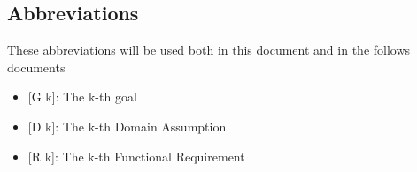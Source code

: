 \subsection{Abbreviations}
These abbreviations will be used both in this document and in the follows documents
\begin{itemize}
	\item {[}G k{]}: The k-th goal
    \item {[}D k{]}: The k-th Domain Assumption
    \item {[}R k{]}: The k-th Functional Requirement
\end{itemize}
